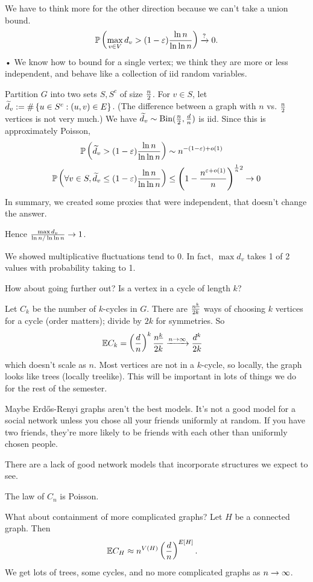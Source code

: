 We have to think more for the other direction because we can't take a union bound.
\begin{align}
\mathbb{P}\left( {\max_{v\in V}d_v > (1-\varepsilon)\frac{\ln n}{\ln \ln n}} \right)\xrightarrow{?} 0.
\end{align}•
We know how to bound for a single vertex; we think they are more or less independent, and behave like a collection of iid random variables.

Partition $G$ into two sets $S,S^c$ of size $\frac{n}{2}$. For $v\in S$, let $\widetilde{d}_v:=\#\left\{{u\in S^c}:{(u,v)\in E}\right\}$. 
(The difference between a graph with $n$ vs. $\frac{n}{2}$ vertices is not very much.)
We have $\widetilde{d}_v \sim \text{Bin}(\frac{n}{2}, \frac{d}{n})$ is iid. Since this is approximately Poisson,
\begin{align}
\mathbb{P}\left( {\widetilde{d}_v>(1-\varepsilon)\frac{\ln n}{\ln \ln n}} \right) &\sim n^{-(1-\varepsilon)+o(1)}\\
\mathbb{P}\left( {\forall v\in S, \widetilde{d}_v\le (1-\varepsilon) \frac{\ln n}{\ln \ln n}} \right) &\le \left( {1-\frac{n^{\varepsilon+o(1)}}{n}} \right)^{\frac{1}{n}2}\to 0
\end{align}
In summary, we created some proxies that were independent, that doesn't change the answer.

Hence $\frac{\max d_v}{\ln n/\ln\ln n}\to 1$.

We showed multiplicative fluctuations tend to 0. In fact, $\max d_v$ takes 1 of 2 values with probability taking to 1.

How about going further out? Is a vertex in a cycle of length $k$?

Let $C_k$ be the number of $k$-cycles in $G$. There are $\frac{n^{\underline{k}}}{2k}$ ways of choosing $k$ vertices for a cycle (order matters); divide by $2k$ for symmetries. So
\begin{align}
\mathbb{E} C_k &= \left( {\frac{d}{n}} \right)^k \frac{n^{\underline{k}}}{2k}\xrightarrow{n\to \infty} \frac{d^k}{2k}
\end{align}
which doesn't scale as $n$.
Most vertices are not in a $k$-cycle, so locally, the graph looks like trees (locally treelike). This will be important in lots of things we do for the rest of the semester. 

Maybe Erd\H os-Renyi graphs aren't the best models. It's not a good model for a social network unless you chose all your friends uniformly at random. If you have two friends, they're more likely to be friends with each other than uniformly chosen people.

There are a lack of good network models that incorporate structures we expect to see.

The law of $C_n$ is Poisson.

What about containment of more complicated graphs? Let $H$ be a connected graph. Then 
\begin{align}
\mathbb{E} C_H &\approx n^{V(H)}\left( {\frac{d}{n}} \right)^{E[H]}.
\end{align}
We get lots of trees, some cycles, and no more complicated graphs as $n\to \infty$.


